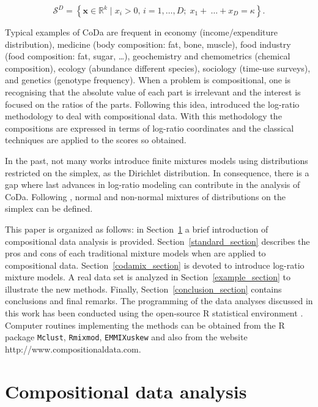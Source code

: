 \documentclass[10pt, a4paper]{article}
\begin{document}
\[
\mathcal{S}^D = \left\{ \textbf{x} \in \mathbb{R}^k \;|\; x_i > 0,\, i=1,\dots, D;\; x_1 + \
\dots + x_D = \kappa \right\}.
\]

Typical examples of CoDa are frequent in economy (income/expenditure distribution), medicine (body composition: fat, bone, muscle), food industry (food composition: fat, sugar, …), geochemistry and chemometrics (chemical composition), ecology (abundance different species), sociology (time-use surveys), and genetics (genotype frequency). 
When a problem is compositional, one is recognising that the absolute value of each part is irrelevant and the interest is focused on the ratios of the parts. Following this idea, \cite{aitchison1986statistical} introduced the log-ratio methodology to deal with compositional data. With this methodology 
the compositions are expressed in terms of log-ratio coordinates and the classical techniques are applied to the scores so obtained.

In the past, not many works \citep[e.g.,][]{albert1982mixtures, bouguila2004unsupervised} introduce finite mixtures models using distributions restricted on the simplex, as the Dirichlet distribution. In consequence, there is a gap where last advances in 
log-ratio modeling can contribute in the analysis of CoDa. Following \cite{mateu2013normal}, normal and non-normal mixtures of distributions on the simplex 
can be defined.

This paper is organized as follows: in Section~\ref{coda_section} a brief introduction of compositional data analysis is provided. Section~\ref{standard_section} describes the pros and cons of each traditional mixture models when are applied to compositional data. Section~\ref{codamix_section} is devoted to introduce log-ratio mixture models. A real data set is analyzed in Section~\ref{example_section} to illustrate the new methods. Finally, Section~\ref{conclusion_section} contains conclusions and final remarks. The programming of the data analyses discussed in this work has been conducted using the open-source R statistical environment \citep{R2013soft}. Computer routines implementing the methods can be obtained from the R package \texttt{Mclust}, \texttt{Rmixmod}, \texttt{EMMIXuskew} and also from the website http://www.compositionaldata.com.






\section{Compositional data analysis}
\label{coda_section}
\end{document}
